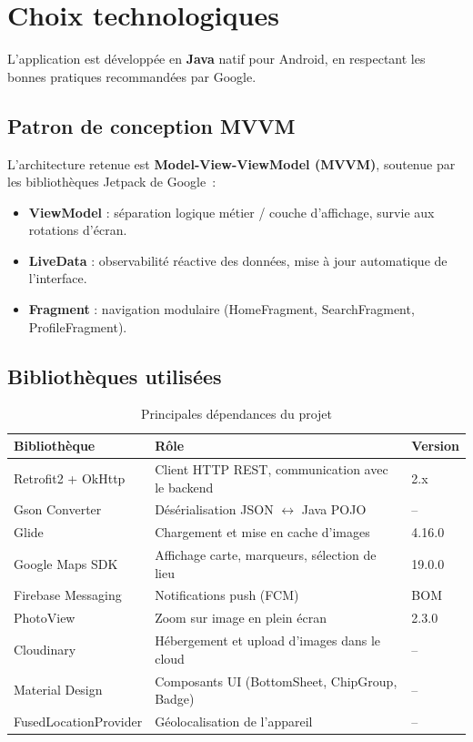 \documentclass[12pt, a4paper]{report}
\begin{document}
\section{Choix technologiques}

L'application est développée en \textbf{Java} natif pour Android, en respectant les bonnes
pratiques recommandées par Google.

\subsection{Patron de conception MVVM}

L'architecture retenue est \textbf{Model-View-ViewModel (MVVM)}, soutenue par les bibliothèques
Jetpack de Google~:

\begin{itemize}
  \item \textbf{ViewModel} : séparation logique métier / couche d'affichage, survie aux
        rotations d'écran.
  \item \textbf{LiveData} : observabilité réactive des données, mise à jour automatique de
        l'interface.
  \item \textbf{Fragment} : navigation modulaire (HomeFragment, SearchFragment, ProfileFragment).
\end{itemize}

\subsection{Bibliothèques utilisées}

\begin{table}[H]
\centering
\caption{Principales dépendances du projet}
\begin{tabularx}{\textwidth}{lXl}
\toprule
\rowcolor{primary!15}
\textbf{Bibliothèque} & \textbf{Rôle} & \textbf{Version} \\
\midrule
Retrofit2 + OkHttp      & Client HTTP REST, communication avec le backend & 2.x \\
Gson Converter          & Désérialisation JSON $\leftrightarrow$ Java POJO & -- \\
Glide                   & Chargement et mise en cache d'images & 4.16.0 \\
Google Maps SDK         & Affichage carte, marqueurs, sélection de lieu & 19.0.0 \\
Firebase Messaging      & Notifications push (FCM) & BOM \\
PhotoView               & Zoom sur image en plein écran & 2.3.0 \\
Cloudinary              & Hébergement et upload d'images dans le cloud & -- \\
Material Design         & Composants UI (BottomSheet, ChipGroup, Badge) & -- \\
FusedLocationProvider   & Géolocalisation de l'appareil & -- \\
\bottomrule
\end{tabularx}
\end{table}
\end{document}
